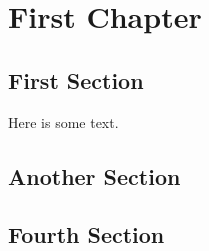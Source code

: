 \documentclass{book}
\begin{document}
  \tableofcontents

  \newpage

  \chapter{First Chapter}

  \section{First Section}

  Here is some text.


  \newpage


  \section{Another Section}

  \section{Fourth Section}
\end{document}
